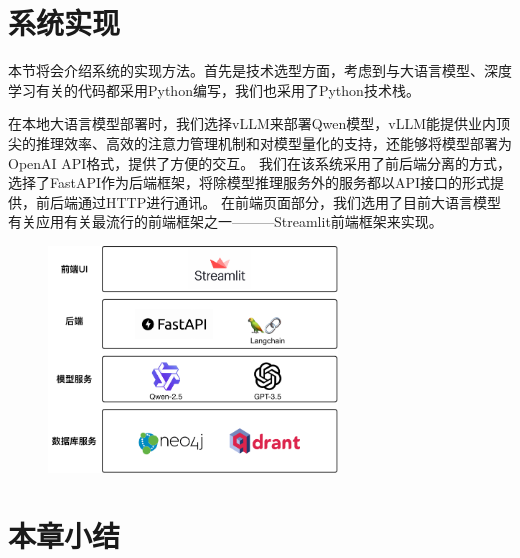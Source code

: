 \section{系统实现}

本节将会介绍系统的实现方法。首先是技术选型方面，考虑到与大语言模型、深度学习有关的代码都采用Python编写，我们也采用了Python技术栈。

在本地大语言模型部署时，我们选择vLLM来部署Qwen模型，vLLM能提供业内顶尖的推理效率、高效的注意力管理机制和对模型量化的支持，还能够将模型部署为OpenAI API格式，提供了方便的交互。
我们在该系统采用了前后端分离的方式，选择了FastAPI作为后端框架，将除模型推理服务外的服务都以API接口的形式提供，前后端通过HTTP进行通讯。
在前端页面部分，我们选用了目前大语言模型有关应用有关最流行的前端框架之一———Streamlit前端框架来实现。

\begin{figure}[!htp]
  \vspace{1em}
  \centering
  \setlength{\abovecaptionskip}{10pt} %
  \includegraphics[height=6cm]{../assets/ch5-系统实现图.pdf}
  \label{fig:implementation}
\end{figure}


\section{本章小结}